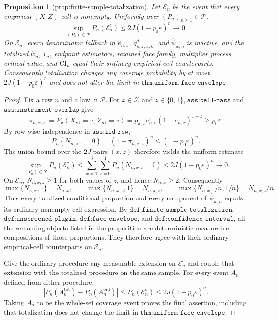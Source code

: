 \documentclass{article}
\newtheorem{proposition}{Proposition}
\begin{document}
\begin{proposition}[prop:finite-sample-totalization]\label{prop:finite-sample-totalization}
Let \(\mathcal E_n\) be the event that every empirical \((X,Z)\) cell is nonempty. Uniformly over \((P_n)_{n\ge1}\in\mathcal P\), \[\sup_{(P_n)\in\mathcal P}P_n(\mathcal E_n^c)\le 2J(1-p_0\varepsilon)^n\longrightarrow0.\] On \(\mathcal E_n\), every denominator fallback in \(\widehat e_{n,x}\), \(\widehat q^d_{n,z,x,k}\), and \(\widehat\psi_{w,n}\) is inactive, and the totalized \(\widehat w_n\), \(\widehat v_n\), endpoint estimators, retained face family, multiplier process, critical value, and \(\mathrm{CI}_n\) equal their ordinary empirical-cell counterparts. Consequently totalization changes any coverage probability by at most \(2J(1-p_0\varepsilon)^n\) and does not alter the limit in \(\texttt{thm:uniform-face-envelope}\).
\end{proposition}
\begin{proof}
Fix a row \(n\) and a law in \(\mathcal P\). For \(x\in\mathcal X\) and \(z\in\{0,1\}\), \(\texttt{ass:cell-mass}\) and \(\texttt{ass:instrument-overlap}\) give
\[
 \pi_{n,x,z}:=P_n(X_{n1}=x,Z_{n1}=z)
 =p_{n,x}e_{n,x}^{z}(1-e_{n,x})^{1-z}
 \ge p_0\varepsilon .
\]
By row-wise independence in \(\texttt{ass:iid-row}\),
\[
 P_n(N_{n,x,z}=0)=(1-\pi_{n,x,z})^n
 \le (1-p_0\varepsilon)^n .
\]
The union bound over the \(2J\) pairs \((x,z)\) therefore yields the uniform estimate
\[
 \sup_{(P_n)\in\mathcal P}P_n(\mathcal E_n^c)
 \le \sum_{x=1}^{J}\sum_{z=0}^{1}P_n(N_{n,x,z}=0)
 \le 2J(1-p_0\varepsilon)^n\longrightarrow0.
\]
On \(\mathcal E_n\), \(N_{n,x,z}\ge1\) for both values of \(z\), and hence \(N_{n,x}\ge2\). Consequently
\[
 \max\{N_{n,x},1\}=N_{n,x},\qquad
 \max\{N_{n,x,z},1\}=N_{n,x,z},\qquad
 \max\{N_{n,x,z}/n,1/n\}=N_{n,x,z}/n.
\]
Thus every totalized conditional proportion and every component of \(\widehat\psi_{w,n}\) equals its ordinary nonempty-cell expression. By \(\texttt{def:finite-sample-totalization}\), \(\texttt{def:unscreened-plugin}\), \(\texttt{def:face-envelope}\), and \(\texttt{def:confidence-interval}\), all the remaining objects listed in the proposition are deterministic measurable compositions of those proportions. They therefore agree with their ordinary empirical-cell counterparts on \(\mathcal E_n\).

Give the ordinary procedure any measurable extension on \(\mathcal E_n^c\) and couple that extension with the totalized procedure on the same sample. For every event \(A_n\) defined from either procedure,
\[
 \left|P_n(A_n^{\mathrm{tot}})-P_n(A_n^{\mathrm{ord}})\right|
 \le P_n(\mathcal E_n^c)
 \le2J(1-p_0\varepsilon)^n.
\]
Taking \(A_n\) to be the whole-set coverage event proves the final assertion, including that totalization does not change the limit in \(\texttt{thm:uniform-face-envelope}\).
\end{proof}
\end{document}
